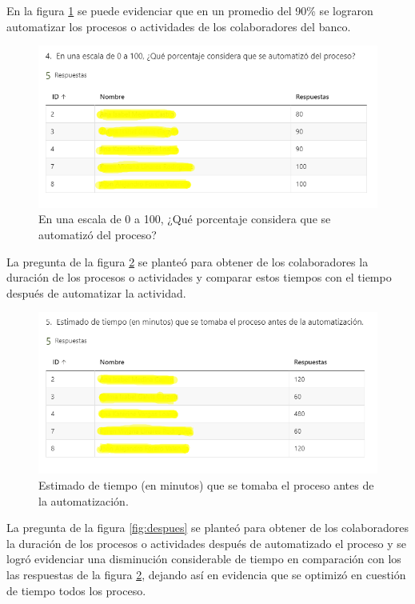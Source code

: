 En la figura \ref{fig:porcentaje} se puede evidenciar que en un promedio del 90\% se lograron automatizar los procesos o actividades de los colaboradores del banco.

\begin{figure}[H]
	\centering
	\includegraphics[scale=0.4]{Capitulo5/imagenes/5}
	\caption{En una escala de 0 a 100, ¿Qué porcentaje considera que se automatizó del proceso?}
	\label{fig:porcentaje}
\end{figure}

La pregunta de la figura \ref{fig:antes} se planteó para obtener de los colaboradores la duración de los procesos o actividades y comparar estos tiempos con el tiempo después de automatizar la actividad.

\begin{figure}[H]
	\centering
	\includegraphics[scale=0.3]{Capitulo5/imagenes/6}
	\caption{Estimado de tiempo (en minutos) que se tomaba el proceso antes de la automatización.}
	\label{fig:antes}
\end{figure}

La pregunta de la figura \ref{fig:despues} se planteó para obtener de los colaboradores la duración de los procesos o actividades después de automatizado el proceso y se logró evidenciar una disminución considerable de tiempo en comparación con los las respuestas de la figura \ref{fig:antes}, dejando así en evidencia que se optimizó en cuestión de tiempo todos los proceso.


